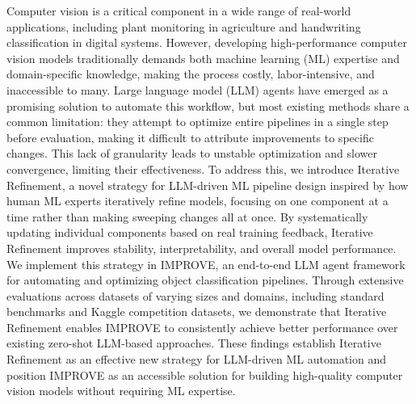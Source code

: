 Computer vision is a critical component in a wide range of real-world applications, including plant monitoring in agriculture and handwriting classification in digital systems. However, developing high-performance computer vision models traditionally demands both machine learning (ML) expertise and domain-specific knowledge, making the process costly, labor-intensive, and inaccessible to many. Large language model (LLM) agents have emerged as a promising solution to automate this workflow, but most existing methods share a common limitation: they attempt to optimize entire pipelines in a single step before evaluation, making it difficult to attribute improvements to specific changes. This lack of granularity leads to unstable optimization and slower convergence, limiting their effectiveness. To address this, we introduce Iterative Refinement, a novel strategy for LLM-driven ML pipeline design inspired by how human ML experts iteratively refine models, focusing on one component at a time rather than making sweeping changes all at once. By systematically updating individual components based on real training feedback, Iterative Refinement improves stability, interpretability, and overall model performance. We implement this strategy in IMPROVE, an end-to-end LLM agent framework for automating and optimizing object classification pipelines. Through extensive evaluations across datasets of varying sizes and domains, including standard benchmarks and Kaggle competition datasets, we demonstrate that Iterative Refinement enables IMPROVE to consistently achieve better performance over existing zero-shot LLM-based approaches. These findings establish Iterative Refinement as an effective new strategy for LLM-driven ML automation and position IMPROVE as an accessible solution for building high-quality computer vision models without requiring ML expertise.